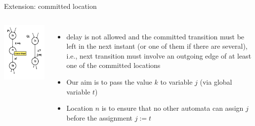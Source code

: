 \documentclass[aspectratio=169]{beamer}
\begin{document}
\begin{slide}{Extension: committed location}
\small\centering


\begin{columns}
   \includegraphics[width=\textwidth]{./images/urgent1.jpg} 

\begin{itemize}
\item delay is not allowed and the committed transition must be left in the next instant (or one of them if there are several), i.e., 
next transition must involve an outgoing edge of at least one of the committed locations
\item Our aim is to pass the value $k$ to variable $j$ (via global variable $t$)
\item Location $n$ is  to ensure that no other automata can assign $j$ before
the assignment $j:=t$
\end{itemize}
\end{columns}


\end{slide}
\end{document}
